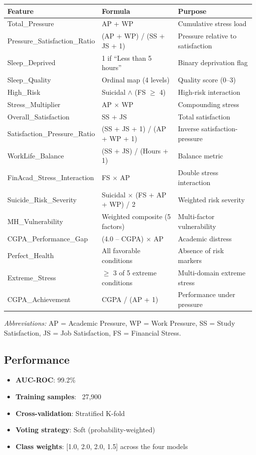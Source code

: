 \documentclass[11pt,a4paper]{article}
\begin{document}
\begin{longtable}{p{4.5cm}p{5.5cm}p{4.5cm}}
\hline
\textbf{Feature} & \textbf{Formula} & \textbf{Purpose} \\
\hline
Total\_Pressure & AP + WP & Cumulative stress load \\
Pressure\_Satisfaction\_Ratio & (AP + WP) / (SS + JS + 1) & Pressure relative to satisfaction \\
Sleep\_Deprived & 1 if ``Less than 5 hours'' & Binary deprivation flag \\
Sleep\_Quality & Ordinal map (4 levels) & Quality score (0--3) \\
High\_Risk & Suicidal $\land$ (FS $\geq$ 4) & High-risk interaction \\
Stress\_Multiplier & AP $\times$ WP & Compounding stress \\
Overall\_Satisfaction & SS + JS & Total satisfaction \\
Satisfaction\_Pressure\_Ratio & (SS + JS + 1) / (AP + WP + 1) & Inverse satisfaction-pressure \\
WorkLife\_Balance & (SS + JS) / (Hours + 1) & Balance metric \\
FinAcad\_Stress\_Interaction & FS $\times$ AP & Double stress interaction \\
Suicide\_Risk\_Severity & Suicidal $\times$ (FS + AP + WP) / 2 & Weighted risk severity \\
MH\_Vulnerability & Weighted composite (5 factors) & Multi-factor vulnerability \\
CGPA\_Performance\_Gap & (4.0 -- CGPA) $\times$ AP & Academic distress \\
Perfect\_Health & All favorable conditions & Absence of risk markers \\
Extreme\_Stress & $\geq$ 3 of 5 extreme conditions & Multi-domain extreme stress \\
CGPA\_Achievement & CGPA / (AP + 1) & Performance under pressure \\
\hline
\end{longtable}

\noindent\textit{Abbreviations:} AP = Academic Pressure, WP = Work Pressure, SS = Study Satisfaction, JS = Job Satisfaction, FS = Financial Stress.

\subsection{Performance}

\begin{itemize}[nosep]
    \item \textbf{AUC-ROC}: 99.2\%
    \item \textbf{Training samples}: ~27,900
    \item \textbf{Cross-validation}: Stratified K-fold
    \item \textbf{Voting strategy}: Soft (probability-weighted)
    \item \textbf{Class weights}: [1.0, 2.0, 2.0, 1.5] across the four models
\end{itemize}
\end{document}
